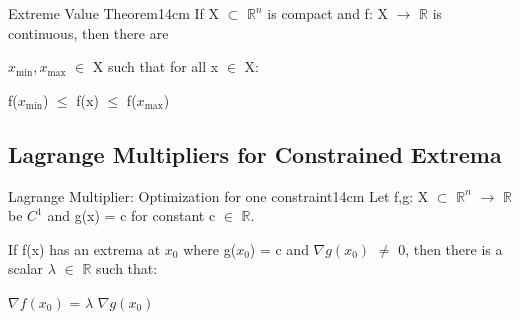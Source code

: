     \vspace{0.5cm}



    \begin{wtheorem}{Extreme Value Theorem}{14cm}
        If X $\subset$ $\mathbb{R}^n$ is compact and
        f: X $\rightarrow$ $\mathbb{R}$ is continuous, then there are

        $x_{\text{min}},x_{\text{max}}$ $\in$ X such that for all x $\in$ X:

        \hspace{0.5cm}
        f($x_{\text{min}}$) $\leq$ f(x) $\leq$ f($x_{\text{max}}$)
    \end{wtheorem}

    \newpage





\subsection[ Lagrange Multipliers ]{ Lagrange Multipliers for Constrained Extrema }

    \begin{wtheorem}{Lagrange Multiplier: Optimization for one constraint}{14cm}
        Let f,g: X $\subset$ $\mathbb{R}^n$ $\rightarrow$ $\mathbb{R}$
        be $C^1$ and g(x) = c for constant c $\in$ $\mathbb{R}$.
        
        If f(x) has an extrema at $x_0$ where g($x_0$) = c and
        $\nabla g(x_0)$ $\not =$ 0, then there is a scalar $\lambda$ $\in$
        $\mathbb{R}$ such that:

        \hspace{0.5cm}
        $\nabla f(x_0)$ = $\lambda$ $\nabla g(x_0)$
    \end{wtheorem}

    \vspace{0.5cm}




